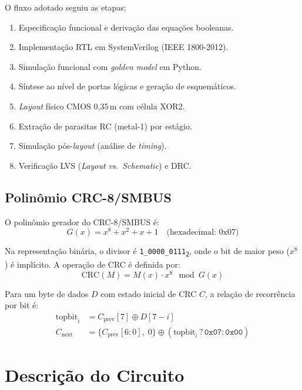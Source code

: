 \documentclass[12pt,a4paper]{article}
\begin{document}
O fluxo adotado seguiu as etapas:

\begin{enumerate}[leftmargin=2em,label=\textbf{\arabic*.}]
  \item Especificação funcional e derivação das equações booleanas.
  \item Implementação RTL em SystemVerilog (IEEE 1800-2012).
  \item Simulação funcional com \textit{golden model} em Python.
  \item Síntese ao nível de portas lógicas e geração de esquemáticos.
  \item \textit{Layout} físico CMOS 0,35\,\textmu m com célula XOR2.
  \item Extração de parasitas RC (metal-1) por estágio.
  \item Simulação pós-\textit{layout} (análise de \textit{timing}).
  \item Verificação LVS (\textit{Layout vs.\ Schematic}) e DRC.
\end{enumerate}

\subsection{Polinômio CRC-8/SMBUS}

O polinômio gerador do CRC-8/SMBUS é:
\begin{equation}
  G(x) = x^8 + x^2 + x + 1 \quad \text{(hexadecimal: 0x07)}
\end{equation}

Na representação binária, o divisor é \texttt{1\_0000\_0111\textsubscript{2}}, onde o bit de maior peso ($x^8$) é implícito. A operação de CRC é definida por:
\begin{equation}
  \text{CRC}(M) = M(x) \cdot x^8 \mod G(x)
\end{equation}

Para um byte de dados $D$ com estado inicial de CRC $C$, a relação de recorrência por bit é:
\begin{align}
  \text{topbit}_i &= C_{\text{prev}}[7] \oplus D[7-i] \\
  C_{\text{next}} &= \{C_{\text{prev}}[6:0],\; 0\} \oplus (\text{topbit}_i \mathbin{?} \texttt{0x07} : \texttt{0x00})
\end{align}

\section{Descrição do Circuito}
\end{document}
